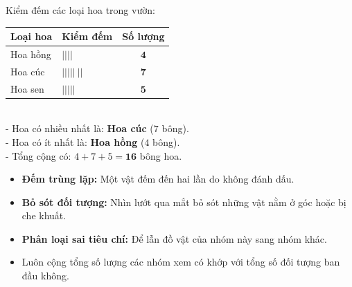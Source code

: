 \documentclass[10pt,a4paper]{article}
\begin{document}
\vspace{-1.5mm}
\noindent
\begin{minipage}[t]{0.49\textwidth}\vspace{0pt}
\begin{tcolorbox}[
  enhanced,
  colback=green!4!white,
  colframe=green!60!black,
  arc=2mm, boxrule=0.8pt,
  left=2mm, right=2mm, top=1.8mm, bottom=1.8mm,
  title={\footnotesize\bfseries\color{white}\faCheckCircle\ 4. Bảng kiểm đếm minh họa}
]
{\footnotesize
Kiểm đếm các loại hoa trong vườn:\\
\begin{tabular}{|l|l|c|}
  \hline
  \textbf{Loại hoa} & \textbf{Kiểm đếm} & \textbf{Số lượng} \\
  \hline
  Hoa hồng & $||||$ & $\mathbf{4}$ \\
  Hoa cúc & $||||| \ ||$ & $\mathbf{7}$ \\
  Hoa sen & $|||||$ & $\mathbf{5}$ \\
  \hline
\end{tabular}
\vspace{1mm}\\
- Hoa có nhiều nhất là: \textbf{Hoa cúc} ($7$ bông).\\
- Hoa có ít nhất là: \textbf{Hoa hồng} ($4$ bông).\\
- Tổng cộng có: $4 + 7 + 5 = \mathbf{16}$ bông hoa.
}
\end{tcolorbox}
\end{minipage}
\hfill
\begin{minipage}[t]{0.49\textwidth}\vspace{0pt}
\begin{tcolorbox}[
  enhanced,
  colback=rose!4!white,
  colframe=rose!70!black,
  arc=2mm, boxrule=0.8pt,
  left=2mm, right=2mm, top=1.8mm, bottom=1.8mm,
  title={\footnotesize\bfseries\color{white}\faExclamationTriangle\ 5. Lỗi thường gặp khi đếm}
]
{\footnotesize
\begin{itemize}\setlength{\itemsep}{1.5pt}\setlength{\leftskip}{-2.5mm}
  \item \textbf{Đếm trùng lặp:} Một vật đếm đến hai lần do không đánh dấu.
  \item \textbf{Bỏ sót đối tượng:} Nhìn lướt qua mắt bỏ sót những vật nằm ở góc hoặc bị che khuất.
  \item \textbf{Phân loại sai tiêu chí:} Để lẫn đồ vật của nhóm này sang nhóm khác.
  \item Luôn cộng tổng số lượng các nhóm xem có khớp với tổng số đối tượng ban đầu không.
\end{itemize}
}
\end{tcolorbox}
\end{minipage}
\end{document}
